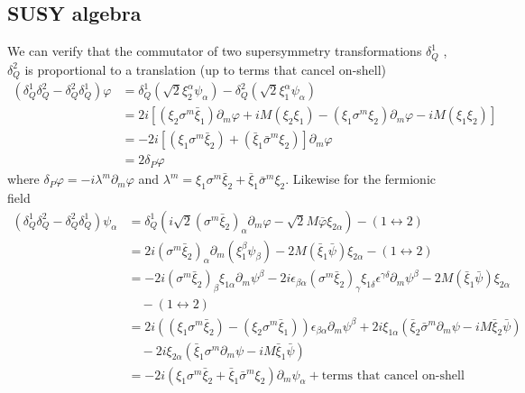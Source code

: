 \documentclass[a4paper,12pt]{article}
\numberwithin{equation}{section}
\numberwithin{exe}{section}
\newcommand{\p}{{\partial}}
\newcommand{\lra}{\leftrightarrow}
\renewcommand{\a}{{\alpha}}
\renewcommand{\b}{{\beta}}
\newcommand{\g}{{\gamma}}
\renewcommand{\d}{{\delta}}
\newcommand{\e}{{\epsilon}}
\renewcommand{\l}{{\lambda}}
\newcommand{\s}{{\sigma}}
\renewcommand{\sb}{{\bar\sigma}}
\newcommand{\vphi}{{\varphi}}
\newcommand{\vphib}{{\bar\varphi}}
\newcommand{\xib}{{\bar\xi}}
\newcommand{\psib}{{\bar\psi}}
\begin{document}
\subsection{SUSY algebra}
We can verify that the commutator of two supersymmetry transformations $\d^1_Q$ , $\d^2_Q$ is proportional to a translation (up to terms that cancel on-shell)
	\begin{align}
	(\d^1_Q \d^2_Q - \d^2_Q \d^1_Q)\vphi & = \d^1_Q (\sqrt2 \xi^\a_2 \psi_\a) - \d^2_Q (\sqrt2 \xi^\a_1 \psi_\a) \nonumber \\
	& = 2i [(\xi_2\s^m\xib_1)\p_m\vphi + iM(\xi_2\xi_1) - (\xi_1\s^m\xi_2) \p_m\vphi -iM(\xi_1\xi_2)] \nonumber \\
	& = -2i [(\xi_1 \s^m\xib_2) + (\xib_1 \sb^m \xi_2) ] \p_m\vphi \nonumber \\
	& = 2 \d_P\vphi
	\end{align}
where $\d_P\vphi = -i\l^m\p_m\vphi$ and $\l^m = \xi_1\s^m\xib_2 + \xib_1 \sb^m \xi_2$. Likewise for the fermionic field
	\begin{align}
	(\d^1_Q \d^2_Q - \d^2_Q \d^1_Q)\psi_\a & = \d^1_Q \left(i\sqrt2 (\s^m\xib_2)_\a\p_m\vphi - \sqrt2 M\vphib \xi_{2\a}\right) - (1\lra 2) \nonumber \\
	& = 2i(\s^m \xib_2)_\a \p_m(\xi^\b_1\psi_\b) - 2M(\xib_1\psib)\xi_{2\a} - (1\lra 2) \nonumber \\
	& = -2i(\s^m\xib_2)_\b \xi_{1\a} \p_m\psi^\b - 2i\e_{\b\a}(\s^m \xib_2)_\g \xi_{1\d} \e^{\g\d} \p_m\psi^\b - 2M(\xib_1\psib)\xi_{2\a} \nonumber \\
	& \quad - (1\lra 2) \nonumber \\
	& = 2i\left( (\xi_1\s^m\xib_2) - (\xi_2\s^m \xib_1) \right)\e_{\b\a} \p_m\psi^\b + 2i\xi_{1\a}(\xib_2\sb^m\p_m\psi - iM\xib_2\psib) \nonumber \\
	& \quad -2i\xi_{2\a}(\xib_1\s^m\p_m\psi - iM \xib_1 \psib) \nonumber \\
	& = -2i (\xi_1\s^m \xib_2 + \xib_1\sb^m\xi_2)\p_m\psi_\a + \text{terms that cancel on-shell}
	\end{align}
\end{document}
